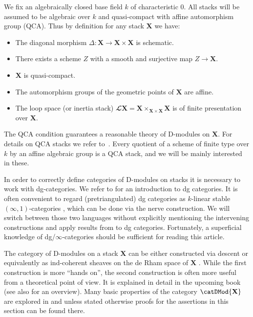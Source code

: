 \documentclass[english]{ck-article}
\let\stack\mathbf
\renewcommand\ls[1]{\mathbfcal{L} #1}
\begin{document}
We fix an algebraically closed base field $k$ of characteristic $0$.
All stacks will be assumed to be algebraic over $k$ and quasi-compact with affine automorphism group (QCA).
Thus by definition for any stack $\stack X$ we have:
\begin{itemize}
    \item The diagonal morphism $Δ\colon \stack X → \stack X × \stack X$ is schematic.
    \item There exists a scheme $Z$ with a smooth and surjective map $Z → \stack X$.
    \item $\stack X$ is quasi-compact.
    \item The automorphism groups of the geometric points of $\stack X$ are affine.
    \item The loop space (or inertia stack) $\ls \stack X = \stack X ×_{\stack X × \stack X} \stack X$ is of finite presentation over $\stack X$.
\end{itemize}
The QCA condition guarantees a reasonable theory of D-modules on $\stack X$.
For details on QCA stacks we refer to~\cite{DrinfeldGaitsgory:2013:FinitenessQuestions}.
Every quotient of a scheme of finite type over $k$ by an affine algebraic group is a QCA stack, and we will be mainly interested in these.

In order to correctly define categories of D-modules on stacks it is necessary to work with dg-categories.
We refer to \cite{Keller:2006:OnDGCategories} for an introduction to dg categories.
It is often convenient to regard (pretriangulated) dg categories as $k$-linear stable $(∞,1)$-categories \cite{Lurie:2009:HigherToposTheory,Lurie:2014-draft:HigherAlgebra}, which can be done via the nerve construction.%
We will switch between those two languages without explicitly mentioning the intervening constructions and apply results from \cite{Lurie:2014-draft:HigherAlgebra} to dg categories.
Fortunately, a superficial knowledge of dg/$∞$-categories should be sufficient for reading this article.

The category of D-modules on a stack $\stack X$ can be either constructed via descent \cite{BeilinsonDrifeld:unpublished:Hitchin,DrinfeldGaitsgory:2013:FinitenessQuestions} or equivalently as ind-coherent sheaves on the de Rham space of $\stack X$ \cite{GaitsgoryRozenblyum:2014:CrystalsAndDModules}.
While the first construction is more \enquote{hands on}, the second construction is often more useful from a theoretical point of view.
It is explained in detail in the upcoming book \cite{GaitsgoryRozenblyum:prelim:StudyInDAG} (see also \cite{FrancisGaitsgory:2012:ChiralKoszulDuality} for an overview).
Many basic properties of the category $\catDMod{\stack X}$ are explored in \cite{DrinfeldGaitsgory:2013:FinitenessQuestions} and unless stated otherwise proofs for the assertions in this section can be found there.
\end{document}
